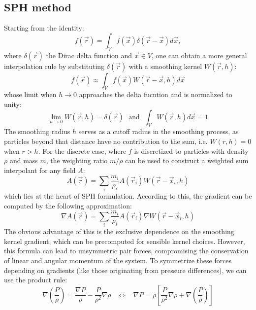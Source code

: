 \documentclass{llncs}
\begin{document}
\subsection{SPH method}
Starting from the identity:
\begin{equation*}
  f(\vec{r}) = \int_Vf(\vec{x}) \delta(\vec{r} - \vec{x}) d\vec{x},
\end{equation*}
where $\delta(\vec{r})$ the Dirac delta function and $\vec{x} \in V$, one can obtain a
more general interpolation rule by substituting $\delta(\vec{r})$ with a smoothing kernel
$W(\vec{r}, h)$:
\begin{equation*}
  \label{eq:c-approx}
  f(\vec{r}) \approx \int_V f(\vec{x}) W(\vec{r}-\vec{x}, h) d\vec{x}
\end{equation*}
whose limit when $h\to0$ approaches the delta fucntion and is normalized to unity:
\begin{equation*}
  \label{eq:kernel-properties}
  \lim_{h\to0}W(\vec{r}, h) = \delta(\vec{r})\ \ \
  \text{and}\ \ \
  \int_VW(\vec{r}, h) d\vec{x} = 1
\end{equation*}
The smoothing radius $h$ serves as a cutoff radius in the smoothing process, as particles
beyond that distance have no contribution to the sum, i.e. $W(r,h) = 0$ when $r>h$. For
the discrete case, where $f$ is discretized to particles with density $\rho$ and mass $m$,
the weighting ratio $m/\rho$ can be used to construct a weighted sum interpolant for any
field $A$:
\begin{equation}
  \label{eq:d-approx}
  A(\vec{r}) = \sum_i \frac{m_i}{\rho_i} A(\vec{r}_i) W(\vec{r}-\vec{x}_i, h)
\end{equation}
which lies at the heart of SPH formulation. According to this, the gradient can be
computed by the following approximation:
\begin{equation}
  \label{eq:d-grad}
  \nabla A(\vec{r}) = \sum_i \frac{m_i}{\rho_i} A(\vec{r}_i) \nabla W(\vec{r} - \vec{x}_i, h)
\end{equation}
The obvious advantage of this is the exclusive dependence on the smoothing kernel
gradient, which can be precomputed for sensible kernel choices. However, this formula can
lead to unsymmetric pair forces, compromising the conservation of linear and angular
momentum of the system. To symmetrize these forces depending on gradients (like those
originating from pressure differences), we can use the product rule:
\begin{equation*}
  \label{eq:grad-identity}
  \nabla \left( \frac{P}{\rho} \right) =
  \frac{\nabla P}{\rho}-
  \frac{P}{\rho^2} \nabla \rho
  \hspace{10pt} \Leftrightarrow \hspace{10pt}
  \nabla P = \rho \left[ \frac{P}{\rho^2} \nabla \rho + \nabla \left( \frac{P}{\rho}
    \right) \right]
\end{equation*}
\end{document}
